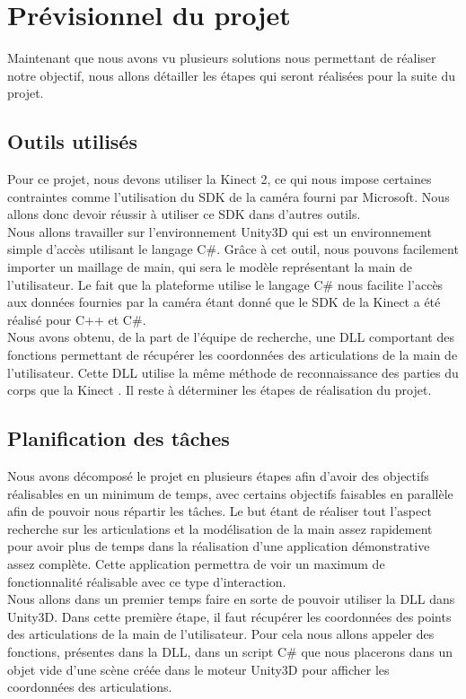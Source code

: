 \chapter{Prévisionnel du projet}
Maintenant que nous avons vu plusieurs solutions nous permettant de réaliser notre 
objectif, nous allons détailler les étapes qui seront réalisées pour la suite du projet.

\section{Outils utilisés}
Pour ce projet, nous devons utiliser la Kinect 2, ce qui nous impose certaines contraintes comme l'utilisation
du SDK de la caméra fourni par Microsoft. Nous allons donc devoir réussir à utiliser ce SDK dans d'autres outils.\\

Nous allons travailler sur l'environnement Unity3D qui est 
un environnement simple d'accès utilisant le langage C\#. Grâce à cet outil, nous pouvons
facilement importer un maillage de main, qui sera le modèle représentant
la main de l'utilisateur. Le fait que la plateforme utilise le langage C\# nous facilite 
l'accès aux données fournies par la caméra étant donné que le SDK de la Kinect a été réalisé pour
C++ et C\#.\\

Nous avons obtenu, de la part de l'équipe de recherche, une DLL comportant des fonctions permettant
de récupérer les coordonnées des articulations de la main de l'utilisateur. Cette DLL utilise 
la même méthode de reconnaissance des parties du corps que la Kinect \cite{export:145347}. Il reste à déterminer les 
étapes de réalisation du projet.

\section{Planification des tâches}
Nous avons décomposé le projet en plusieurs étapes afin d'avoir des objectifs réalisables en 
un minimum de temps, avec certains objectifs faisables en parallèle afin de pouvoir nous répartir
les tâches. Le but étant de réaliser tout l'aspect recherche sur les articulations et la modélisation de la main assez rapidement pour 
avoir plus de temps dans la réalisation d'une application démonstrative assez complète. Cette application
permettra de voir un maximum de fonctionnalité réalisable avec ce type d'interaction.\\

Nous allons dans un premier temps faire en sorte de pouvoir utiliser la DLL dans Unity3D.
Dans cette première étape, il faut récupérer les coordonnées des points des articulations
de la main de l'utilisateur. Pour cela nous allons appeler des fonctions, présentes dans la DLL, dans un 
script C\# que nous placerons dans un objet vide d'une scène créée dans le moteur Unity3D pour
afficher les coordonnées des articulations.\\

